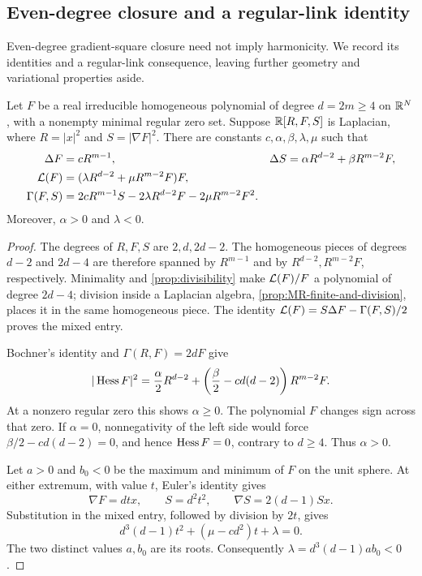 \subsection{Even-degree closure and a regular-link identity}
\label{sec:even-gradient-structure}

Even-degree gradient-square closure need not imply harmonicity.
We record its identities and a regular-link consequence, leaving
further geometry and variational properties aside.

\begin{proposition}
\label{prop:even-gradient-closure}
Let \(F\) be a real irreducible homogeneous polynomial of degree
\(d=2m\ge4\) on \(\mathbb R^N\), with a nonempty minimal regular zero set.
Suppose \(\mathbb R[R,F,S]\) is Laplacian, where
\(R=|x|^2\) and \(S=|\nabla F|^2\).
There are constants \(c,\alpha,\beta,\lambda,\mu\) such that
\begin{equation}\label{eq:even-rfs-closure}
\begin{aligned}
 \Delta F&=cR^{m-1},&
 \Delta S&=\alpha R^{d-2}+\beta R^{m-2}F,\\
 \mathcal L(F)&=(\lambda R^{d-2}+\mu R^{m-2}F)F,\\
 \Gamma(F,S)&=2cR^{m-1}S
       -2\lambda R^{d-2}F-2\mu R^{m-2}F^2.
\end{aligned}
\end{equation}
Moreover, \(\alpha>0\) and \(\lambda<0\).
\end{proposition}

\begin{proof}
The degrees of \(R,F,S\) are \(2,d,2d-2\).
The homogeneous pieces of degrees \(d-2\) and \(2d-4\) are
therefore spanned by \(R^{m-1}\) and by
\(R^{d-2},R^{m-2}F\), respectively.
Minimality and \cref{prop:divisibility} make \(\mathcal L(F)/F\)
a polynomial of degree \(2d-4\); division inside a Laplacian
algebra, \cref{prop:MR-finite-and-division}, places it in the same
homogeneous piece. The identity
\(\mathcal L(F)=S\Delta F-\Gamma(F,S)/2\) proves the mixed entry.

Bochner's identity and \(\Gamma(R,F)=2dF\) give
\begin{equation}\label{eq:even-bochner}
 |\operatorname{Hess} F|^2=\frac\alpha2R^{d-2}
       +\left(\frac\beta2-cd(d-2)\right)R^{m-2}F.
\end{equation}
At a nonzero regular zero this shows \(\alpha\ge0\).
The polynomial \(F\) changes sign across that zero.
If \(\alpha=0\), nonnegativity of the left side would force
\(\beta/2-cd(d-2)=0\), and hence \(\operatorname{Hess} F=0\), contrary
to \(d\ge4\). Thus \(\alpha>0\).

Let \(a>0\) and \(b_0<0\) be the maximum and minimum of
\(F\) on the unit sphere. At either extremum, with value \(t\),
Euler's identity gives
\[
 \nabla F=dt x,\qquad S=d^2t^2,\qquad
 \nabla S=2(d-1)Sx.
\]
Substitution in the mixed entry, followed by division by \(2t\),
gives
\[
 d^3(d-1)t^2+(\mu-cd^2)t+\lambda=0.
\]
The two distinct values \(a,b_0\) are its roots. Consequently
\(\lambda=d^3(d-1)ab_0<0\).
\end{proof}

